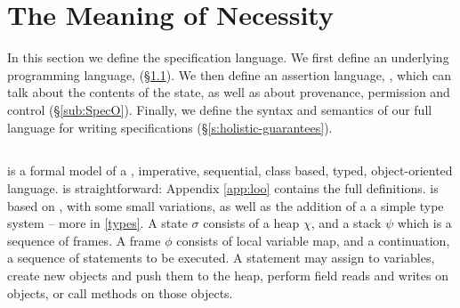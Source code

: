 \section{The Meaning of Necessity}
\label{s:semantics}

 
In this section we define {the}  \Nec specification language.  
We first define an underlying programming language, \Loo (\S \ref{sub:Loo}).
We then define an assertion language, \SpecO, which can talk about the
contents of the state, as well as about provenance, permission and
control (\S \ref{sub:SpecO}).  Finally, we define the syntax and
semantics of our full language for writing \Nec
specifications (\S \ref{s:holistic-guarantees}).


\subsection{\Loo}
\label{sub:Loo} 
 \Loo is a formal model of a , imperative, sequential, 
class based, typed, object-oriented language.
\Loo is straightforward:
Appendix \ref{app:loo} contains 
the full definitions.
\Loo is based on \LangOO 
\cite{FASE}, with some small variations, as well as 
the addition of a %
 a simple type system -- more in \ref{types}.
%
%
A \Loo state $\sigma$ consists of a 
heap $\chi$, and a  {stack $\psi$ which is a sequence of frames}.
A frame $\phi$ consists of
local variable map, and a continuation, \ie a sequence of statements to be executed.
 A statement may assign to variables, create new objects and push them to the heap, 
perform field reads and writes on objects,  or
 call methods on those objects. 

